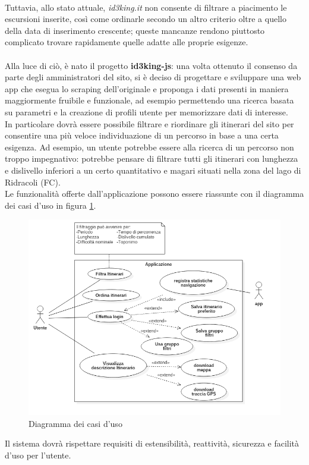 \documentclass[11pt]{report}
\begin{document}
\\Tuttavia, allo stato attuale, \textit{id3king.it} non consente di filtrare a piacimento le escursioni inserite, così come ordinarle secondo un altro criterio oltre a quello della data di inserimento crescente; queste mancanze rendono piuttosto complicato trovare rapidamente quelle adatte alle proprie esigenze.
\\\\Alla luce di ciò, è nato il progetto \textbf{id3king-js}: una volta ottenuto il consenso da parte degli amministratori del sito, si è deciso di progettare e sviluppare una web app che esegua lo scraping dell'originale e proponga i dati presenti in maniera maggiormente fruibile e funzionale, ad esempio permettendo una ricerca basata su parametri e la creazione di profili utente per memorizzare dati di interesse.
\\In particolare dovrà essere possibile filtrare e riordinare gli itinerari del sito per consentire una più veloce individuazione di un percorso in base a una certa esigenza.
Ad esempio, un utente potrebbe essere alla ricerca di un percorso non troppo impegnativo: potrebbe pensare di filtrare tutti gli itinerari con lunghezza e dislivello inferiori a un certo quantitativo e magari situati nella zona del lago di Ridracoli (FC).
\\Le funzionalità offerte dall'applicazione possono essere riassunte con il diagramma dei casi d'uso in figura \ref{use_case_diagram}.
\begin{figure}
	\centering
	\includegraphics[scale=0.5]{use_case_diagram}
	\caption{Diagramma dei casi d'uso \label{use_case_diagram}}
\end{figure}
Il sistema dovrà rispettare requisiti di estensibilità, reattività, sicurezza e facilità d'uso per l'utente.
\pagebreak
\end{document}
